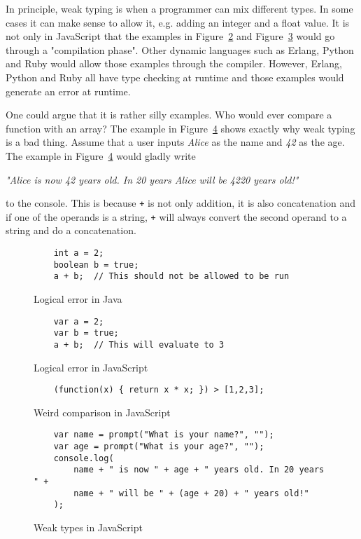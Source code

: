 In principle, weak typing is when a programmer can mix different types. In some cases it can make sense to allow it, e.g. adding an integer and a float value. It is not only in JavaScript that the examples in Figure~\ref{fig:error_js} and Figure~\ref{fig:js_comparison} would go through a "compilation phase". Other dynamic languages such as Erlang, Python and Ruby would allow those examples through the compiler. However, Erlang, Python and Ruby all have type checking at runtime and those examples would generate an error at runtime.

One could argue that it is rather silly examples. Who would ever compare a function with an array? The example in Figure~\ref{fig:js_bad_age} shows exactly why weak typing is a bad thing. Assume that a user inputs \emph{Alice} as the name and \emph{42} as the age. The example in Figure~\ref{fig:js_bad_age} would gladly write
\begin{center}
  \emph{"Alice is now 42 years old. In 20 years Alice will be 4220 years old!"}
\end{center}
to the console. This is because {\tt +} is not only addition, it is also concatenation and if one of the operands is a string, {\tt +} will always convert the second operand to a string and do a concatenation.

\begin{figure}[h]
  \begin{verbatim}
    int a = 2;
    boolean b = true;
    a + b;  // This should not be allowed to be run
  \end{verbatim}
  \caption{Logical error in Java}
  \label{fig:error_java}
\end{figure}
\begin{figure}[h]
  \begin{verbatim}
    var a = 2;
    var b = true;
    a + b;  // This will evaluate to 3
  \end{verbatim}
  \caption{Logical error in JavaScript}
  \label{fig:error_js}
\end{figure}
\begin{figure}[h]
  \begin{verbatim}
    (function(x) { return x * x; }) > [1,2,3];
  \end{verbatim}
  \caption{Weird comparison in JavaScript}
  \label{fig:js_comparison}
\end{figure}
\begin{figure}[h]
  \begin{verbatim}
    var name = prompt("What is your name?", "");
    var age = prompt("What is your age?", "");
    console.log(
        name + " is now " + age + " years old. In 20 years " +
        name + " will be " + (age + 20) + " years old!"
    );
  \end{verbatim}
  \caption{Weak types in JavaScript}
  \label{fig:js_bad_age}
\end{figure}

